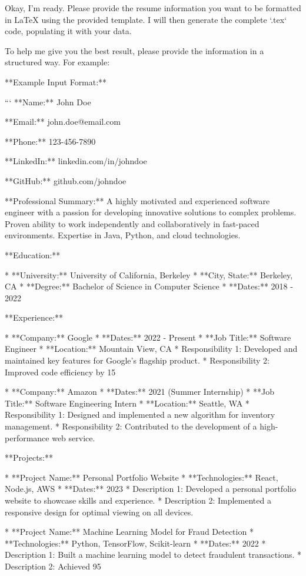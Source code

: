 Okay, I'm ready. Please provide the resume information you want to be formatted in LaTeX using the provided template. I will then generate the complete `.tex` code, populating it with your data.

To help me give you the best result, please provide the information in a structured way. For example:

**Example Input Format:**

```
**Name:** John Doe

**Email:** john.doe@email.com

**Phone:** 123-456-7890

**LinkedIn:** linkedin.com/in/johndoe

**GitHub:** github.com/johndoe

**Professional Summary:**  A highly motivated and experienced software engineer with a passion for developing innovative solutions to complex problems. Proven ability to work independently and collaboratively in fast-paced environments. Expertise in Java, Python, and cloud technologies.

**Education:**

*   **University:** University of California, Berkeley
*   **City, State:** Berkeley, CA
*   **Degree:** Bachelor of Science in Computer Science
*   **Dates:** 2018 - 2022

**Experience:**

*   **Company:** Google
*   **Dates:** 2022 - Present
*   **Job Title:** Software Engineer
*   **Location:** Mountain View, CA
    *   Responsibility 1: Developed and maintained key features for Google's flagship product.
    *   Responsibility 2: Improved code efficiency by 15%

*   **Company:** Amazon
*   **Dates:** 2021 (Summer Internship)
*   **Job Title:** Software Engineering Intern
*   **Location:** Seattle, WA
    *   Responsibility 1: Designed and implemented a new algorithm for inventory management.
    *   Responsibility 2: Contributed to the development of a high-performance web service.

**Projects:**

*   **Project Name:** Personal Portfolio Website
*   **Technologies:** React, Node.js, AWS
*   **Dates:** 2023
    *   Description 1: Developed a personal portfolio website to showcase skills and experience.
    *   Description 2: Implemented a responsive design for optimal viewing on all devices.

*   **Project Name:** Machine Learning Model for Fraud Detection
*   **Technologies:** Python, TensorFlow, Scikit-learn
*   **Dates:** 2022
    *   Description 1: Built a machine learning model to detect fraudulent transactions.
    *   Description 2: Achieved 95%

